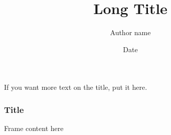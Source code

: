 \documentclass{beamer}
\title[Short Title]{Long Title}
\author[A.~Name]{Author name}
\institute[Carleton]{Carleton College}
\date{Date}
\begin{document}
\begin{frame}
  \titlepage

  \begin{center}
    If you want more text on the title, put it here.
  \end{center}
\end{frame}

\begin{frame}
  \frametitle{Title}
  Frame content here
\end{frame}
\end{document}

